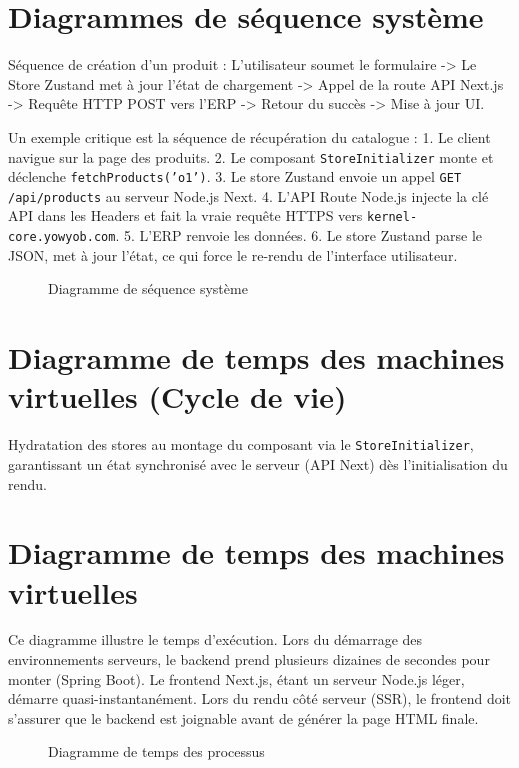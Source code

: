 \documentclass[12pt, a4paper]{report}
\begin{document}
\section{Diagrammes de séquence système}
Séquence de création d'un produit : L'utilisateur soumet le formulaire -> Le Store Zustand met à jour l'état de chargement -> Appel de la route API Next.js -> Requête HTTP POST vers l'ERP -> Retour du succès -> Mise à jour UI.

Un exemple critique est la séquence de récupération du catalogue :
1. Le client navigue sur la page des produits.
2. Le composant \texttt{StoreInitializer} monte et déclenche \texttt{fetchProducts('o1')}.
3. Le store Zustand envoie un appel \texttt{GET /api/products} au serveur Node.js Next.
4. L'API Route Node.js injecte la clé API dans les Headers et fait la vraie requête HTTPS vers \texttt{kernel-core.yowyob.com}.
5. L'ERP renvoie les données.
6. Le store Zustand parse le JSON, met à jour l'état, ce qui force le re-rendu de l'interface utilisateur.

\begin{figure}[h!]
    \centering
    \vspace{6cm} %
    \caption{Diagramme de séquence système}
    \label{fig:sequence}
\end{figure}

\section{Diagramme de temps des machines virtuelles (Cycle de vie)}
Hydratation des stores au montage du composant via le \texttt{StoreInitializer}, garantissant un état synchronisé avec le serveur (API Next) dès l'initialisation du rendu.

\section{Diagramme de temps des machines virtuelles}
Ce diagramme illustre le temps d'exécution. Lors du démarrage des environnements serveurs, le backend prend plusieurs dizaines de secondes pour monter (Spring Boot). Le frontend Next.js, étant un serveur Node.js léger, démarre quasi-instantanément. Lors du rendu côté serveur (SSR), le frontend doit s'assurer que le backend est joignable avant de générer la page HTML finale.

\begin{figure}[h!]
    \centering
    \vspace{6cm} %
    \caption{Diagramme de temps des processus}
    \label{fig:temps}
\end{figure}
\end{document}
